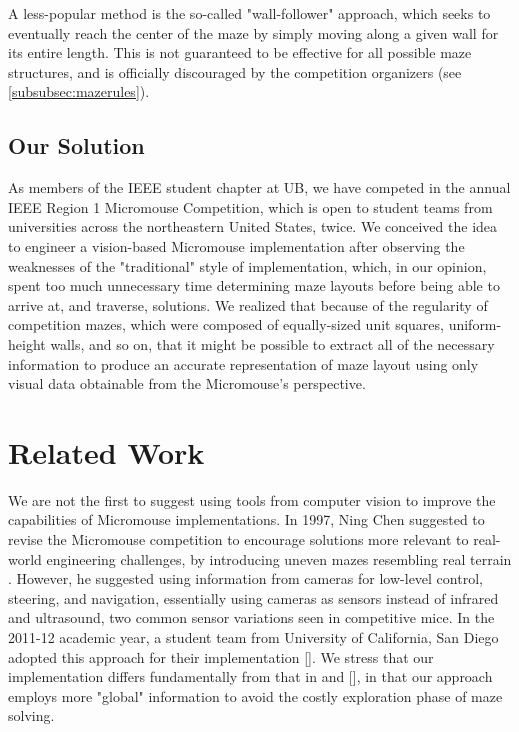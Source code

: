 \documentclass[10pt,twocolumn,letterpaper]{article}
\begin{document}
A less-popular method is the so-called "wall-follower" approach, which seeks to eventually reach the center of the maze
by simply moving along a given wall for its entire length.  This is not guaranteed to be effective for all possible maze
structures, and is officially discouraged by the competition organizers (see \textsection\ref{subsubsec:mazerules}).

\subsection{Our Solution}
\label{subsec:oursolution}

As members of the IEEE student chapter at UB, we have competed in the annual IEEE Region 1 Micromouse Competition, which
is open to student teams from universities across the northeastern United States, twice.  We conceived the idea to
engineer a vision-based Micromouse implementation after observing the weaknesses of the "traditional" style of
implementation, which, in our opinion, spent too much unnecessary time determining maze layouts before being able to
arrive at, and traverse, solutions.  We realized that because of the regularity of competition mazes, which were
composed of equally-sized unit squares, uniform-height walls, and so on, that it might be possible to extract all of the
necessary information to produce an accurate representation of maze layout using only visual data obtainable from the
Micromouse's perspective.

\section{Related Work}
\label{sec:relatedwork}

We are not the first to suggest using tools from computer vision to improve the capabilities of Micromouse
implementations.  In 1997, Ning Chen suggested to revise the Micromouse competition to encourage solutions more relevant
to real-world engineering challenges, by introducing uneven mazes resembling real terrain \cite{Chen1997}.  However, he
suggested using information from cameras for low-level control, steering, and navigation, essentially using cameras as
sensors instead of infrared and ultrasound, two common sensor variations seen in competitive mice.  In the 2011-12
academic year, a student team from University of California, San Diego adopted this approach for their implementation
[].  We stress that our implementation differs fundamentally from that in \cite{Chen1997} and [], in that our approach employs more "global" information to avoid the costly exploration phase of maze solving.
\end{document}

